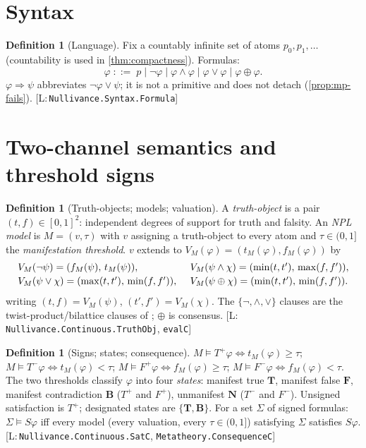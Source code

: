 \documentclass[11pt,a4paper]{article}
\theoremstyle{definition}
\newtheorem{definition}[theorem]{Definition}
\newcommand{\vT}{\mathbf{T}}
\newcommand{\vF}{\mathbf{F}}
\newcommand{\vB}{\mathbf{B}}
\newcommand{\vN}{\mathbf{N}}
\newcommand{\hmz}{\oplus}                       %
\newcommand{\Tp}{T^{+}}\newcommand{\Tm}{T^{-}}
\newcommand{\Fp}{F^{+}}\newcommand{\Fm}{F^{-}}
\newcommand{\lean}[1]{\texttt{#1}}
\begin{document}
\section{Syntax}\label{sec:syntax}

\begin{definition}[Language]\label{def:lang}
Fix a countably infinite set of atoms $p_0,p_1,\dots$ (countability is used
in \cref{thm:compactness}). Formulas:
\[
\varphi \;::=\; p \mid \lnot\varphi \mid \varphi\wedge\varphi \mid
\varphi\vee\varphi \mid \varphi\hmz\varphi .
\]
$\varphi\Rightarrow\psi$ abbreviates $\lnot\varphi\vee\psi$; it is not a
primitive and does not detach (\cref{prop:mp-fails}).
[L:\,\lean{Nullivance.Syntax.Formula}]
\end{definition}

\section{Two-channel semantics and threshold signs}\label{sec:semantics}

\begin{definition}[Truth-objects; models; valuation]\label{def:model}
A \emph{truth-object} is a pair $(t,f)\in[0,1]^2$: independent degrees of
support for truth and falsity. An \emph{NPL model} is $M=(v,\tau)$ with $v$
assigning a truth-object to every atom and $\tau\in(0,1]$ the
\emph{manifestation threshold}. $v$ extends to
$V_M(\varphi)=(t_M(\varphi),f_M(\varphi))$ by
\[
\setlength{\arraycolsep}{2pt}
\begin{array}{ll}
V_M(\lnot\psi) = (f_M(\psi),\,t_M(\psi)), \quad &
V_M(\psi\wedge\chi) = (\min(t,t'),\,\max(f,f')),\\[2pt]
V_M(\psi\vee\chi) = (\max(t,t'),\,\min(f,f')), \quad &
V_M(\psi\hmz\chi) = (\min(t,t'),\,\min(f,f')).
\end{array}
\]
writing $(t,f)=V_M(\psi)$, $(t',f')=V_M(\chi)$. The
$\{\lnot,\wedge,\vee\}$ clauses are the twist-product/bilattice clauses of
\cite{bilkova2022paraconsistent,fitting1991bilattices}; $\hmz$ is consensus.
[L:\,\lean{Nullivance.Continuous.TruthObj}, \lean{evalC}]
\end{definition}

\begin{definition}[Signs; states; consequence]\label{def:consequence}
$M\models\Tp\varphi \iff t_M(\varphi)\ge\tau$;
$M\models\Tm\varphi \iff t_M(\varphi)<\tau$;
$M\models\Fp\varphi \iff f_M(\varphi)\ge\tau$;
$M\models\Fm\varphi \iff f_M(\varphi)<\tau$.
The two thresholds classify $\varphi$ into four \emph{states}: manifest true
$\vT$, manifest false $\vF$, manifest contradiction $\vB$ ($\Tp$ and $\Fp$),
unmanifest $\vN$ ($\Tm$ and $\Fm$). Unsigned satisfaction is $\Tp$;
designated states are $\{\vT,\vB\}$. For a set $\Sigma$ of signed formulas:
$\Sigma\models S\varphi$ iff every model (every valuation, every
$\tau\in(0,1]$) satisfying $\Sigma$ satisfies $S\varphi$.
[L:\,\lean{Nullivance.Continuous.SatC}, \lean{Metatheory.ConsequenceC}]
\end{definition}
\end{document}
